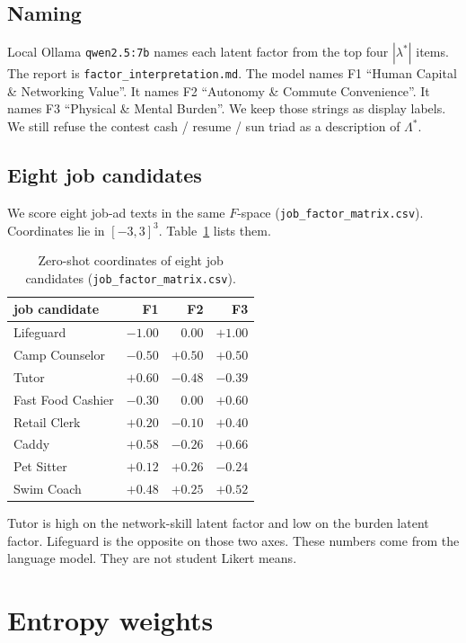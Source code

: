 \documentclass[12pt]{article}
\begin{document}
\subsection{Naming}
Local Ollama \texttt{qwen2.5:7b} names each latent factor from the top four \(|\lambda^{\ast}|\) items.
The report is \texttt{factor\_interpretation.md}.
The model names F1 ``Human Capital \& Networking Value''.
It names F2 ``Autonomy \& Commute Convenience''.
It names F3 ``Physical \& Mental Burden''.
We keep those strings as display labels.
We still refuse the contest cash / resume / sun triad as a description of \(\Lambda^{\ast}\).

\subsection{Eight job candidates}
We score eight job-ad texts in the same \(F\)-space
(\texttt{job\_factor\_matrix.csv}).
Coordinates lie in \([-3,3]^3\).
Table~\ref{tab:jobs} lists them.

\begin{table}[ht]
\centering
\caption{Zero-shot coordinates of eight job candidates
(\texttt{job\_factor\_matrix.csv}).}
\label{tab:jobs}
\begin{tabular}{@{}lrrr@{}}
\toprule
job candidate & F1 & F2 & F3 \\
\midrule
Lifeguard & \(-1.00\) & \(0.00\) & \(+1.00\) \\
Camp Counselor & \(-0.50\) & \(+0.50\) & \(+0.50\) \\
Tutor & \(+0.60\) & \(-0.48\) & \(-0.39\) \\
Fast Food Cashier & \(-0.30\) & \(0.00\) & \(+0.60\) \\
Retail Clerk & \(+0.20\) & \(-0.10\) & \(+0.40\) \\
Caddy & \(+0.58\) & \(-0.26\) & \(+0.66\) \\
Pet Sitter & \(+0.12\) & \(+0.26\) & \(-0.24\) \\
Swim Coach & \(+0.48\) & \(+0.25\) & \(+0.52\) \\
\bottomrule
\end{tabular}
\end{table}

Tutor is high on the network-skill latent factor and low on the burden latent factor.
Lifeguard is the opposite on those two axes.
These numbers come from the language model.
They are not student Likert means.

\section{Entropy weights}
\end{document}
